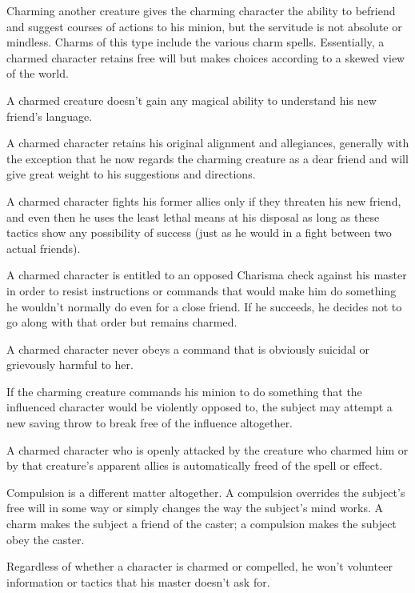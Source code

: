 Charming another creature gives the charming character the ability to befriend and suggest courses of actions to his minion, but the servitude is not absolute or mindless. Charms of this type include the various charm spells. Essentially, a charmed character retains free will but makes choices according to a skewed view of the world.

\begin{itemize*}
\item A charmed creature doesn't gain any magical ability to understand his new friend's language.
\item A charmed character retains his original alignment and allegiances, generally with the exception that he now regards the charming creature as a dear friend and will give great weight to his suggestions and directions.
\item A charmed character fights his former allies only if they threaten his new friend, and even then he uses the least lethal means at his disposal as long as these tactics show any possibility of success (just as he would in a fight between two actual friends).
\item A charmed character is entitled to an opposed Charisma check against his master in order to resist instructions or commands that would make him do something he wouldn't normally do even for a close friend. If he succeeds, he decides not to go along with that order but remains charmed.
\item A charmed character never obeys a command that is obviously suicidal or grievously harmful to her.
\item If the charming creature commands his minion to do something that the influenced character would be violently opposed to, the subject may attempt a new saving throw to break free of the influence altogether.
\item A charmed character who is openly attacked by the creature who charmed him or by that creature's apparent allies is automatically freed of the spell or effect.
\item Compulsion is a different matter altogether. A compulsion overrides the subject's free will in some way or simply changes the way the subject's mind works. A charm makes the subject a friend of the caster; a compulsion makes the subject obey the caster.
\end{itemize*}

Regardless of whether a character is charmed or compelled, he won't volunteer information or tactics that his master doesn't ask for.


